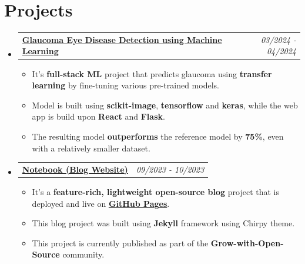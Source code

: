 \documentclass[a4paper,11pt]{article}
\makeatletter
\newcommand{\resumeProject}[3]{
\vspace{0.5mm}\item
    \begin{tabular*}{0.98\textwidth}[t]{l@{\extracolsep{\fill}}r}
        \textbf{#1} & \textit{\footnotesize{#2}} \\
    \end{tabular*}
    \vspace{-2.4mm}
}
\newcommand{\resumeSubHeadingListStart}{\begin{itemize}[leftmargin=*,labelsep=0mm]}
\newcommand{\resumeItemListStart}{\begin{justify}\begin{itemize}[leftmargin=3ex, rightmargin=2ex, noitemsep,labelsep=1.2mm,itemsep=0mm]\small}
\newcommand{\resumeSubHeadingListEnd}{\end{itemize}\vspace{2mm}}
\newcommand{\resumeItemListEnd}{\end{itemize}\end{justify}\vspace{-2mm}}
\makeatother
\begin{document}
\section{\textbf{Projects}}
 \resumeSubHeadingListStart
    \resumeProject
      {\href{https://github.com/iamwatchdogs/Glaucoma-Detection-using-Transfer-Learning}{Glaucoma Eye Disease Detection using Machine Learning}} %
      {03/2024 - 04/2024} \\ %
      \resumeItemListStart
        \item {It's \textbf{full-stack ML} project that predicts glaucoma using \textbf{transfer learning} by fine-tuning various pre-trained models.}
        \item {Model is built using \textbf{scikit-image}, \textbf{tensorflow} and \textbf{keras}, while the web app is build upon \textbf{React} and \textbf{Flask}.}
        \item {The resulting model \textbf{outperforms} the reference model by \textbf{75\%}, even with a relatively smaller dataset.}
    \resumeItemListEnd
    \vspace{-1mm}
  \resumeSubHeadingListEnd
  \vspace{-4mm}
    \resumeSubHeadingListStart
    \resumeProject
      {\href{https://github.com/iamwatchdogs/Notebook}{Notebook (Blog Website)}} %
      {09/2023 - 10/2023} \\%
      \resumeItemListStart
        \item {It’s a \textbf{feature-rich, lightweight open-source blog} project that is deployed and live on \textbf{\href{https://grow-with-open-source.github.io/Notebook/}{GitHub Pages}}.}
        \item {This blog project was built using \textbf{Jekyll} framework using Chirpy theme.}
        \item {This project is currently published as part of the \textbf{Grow-with-Open-Source} community.}
    \resumeItemListEnd
    \resumeSubHeadingListEnd
\vspace{-6mm}



\end{document}

